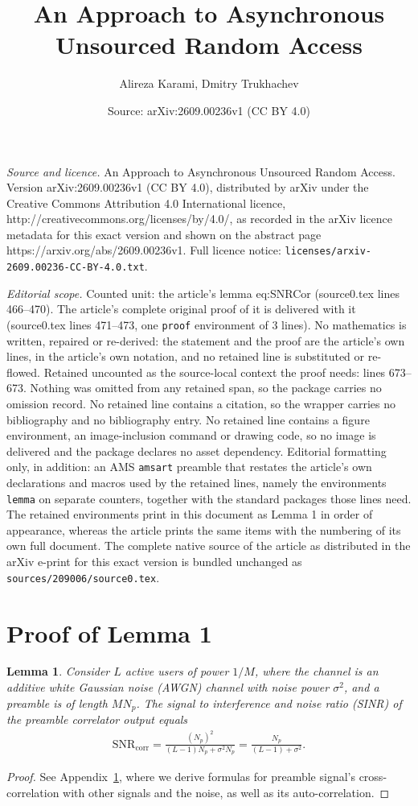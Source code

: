 \documentclass[10pt,a4paper]{amsart}
\title{An Approach to Asynchronous Unsourced Random Access}
\author{Alireza Karami, Dmitry Trukhachev}
\date{Source: arXiv:2609.00236v1 (CC BY 4.0)}
\newtheorem{lemma}{Lemma}
\begin{document}
\maketitle

\noindent\emph{Source and licence.} An Approach to Asynchronous Unsourced Random Access. Version arXiv:2609.00236v1 (CC BY 4.0), distributed by arXiv under the Creative Commons Attribution 4.0 International licence, http://creativecommons.org/licenses/by/4.0/, as recorded in the arXiv licence metadata for this exact version and shown on the abstract page https://arxiv.org/abs/2609.00236v1. Full licence notice: \texttt{licenses/arxiv-2609.00236-CC-BY-4.0.txt}.\par\smallskip

\noindent\textit{Editorial scope.} Counted unit: the article's lemma eq:SNRCor (source0.tex lines 466--470). The article's complete original proof of it is delivered with it (source0.tex lines 471--473, one \texttt{proof} environment of 3 lines). No mathematics is written, repaired or re-derived: the statement and the proof are the article's own lines, in the article's own notation, and no retained line is substituted or re-flowed.  Retained uncounted as the source-local context the proof needs: lines 673--673.  Nothing was omitted from any retained span, so the package carries no omission record.  No retained line contains a citation, so the wrapper carries no bibliography and no bibliography entry.  No retained line contains a figure environment, an image-inclusion command or drawing code, so no image is delivered and the package declares no asset dependency.  Editorial formatting only, in addition: an AMS \texttt{amsart} preamble that restates the article's own declarations and macros used by the retained lines, namely the environments \texttt{lemma} on separate counters, together with the standard packages those lines need.  The retained environments print in this document as Lemma 1 in order of appearance, whereas the article prints the same items with the numbering of its own full document.  The complete native source of the article as distributed in the arXiv e-print for this exact version is bundled unchanged as \texttt{sources/209006/source0.tex}.
\section{Proof of Lemma 1}\label{Ap:Cor}

\begin{lemma} Consider $L$ active users of power $1/M$, where the channel is an additive white Gaussian noise (AWGN) channel with noise power $\sigma^2$, and a preamble is of length $MN_p$. The signal to interference and noise ratio (SINR) of the preamble correlator output equals
	\begin{align}
	\text{SNR}_{\text{corr}} = \frac{(N_p)^2}{(L-1)N_p+\sigma^2N_p}=\frac{N_p}{(L-1)+\sigma^2}.\label{eq:SNRCor}
	\end{align}
\end{lemma}

\begin{proof}
	See Appendix~\ref{Ap:Cor}, where we derive formulas for preamble signal's cross-correlation with other signals and the noise, as well as its auto-correlation.
\end{proof}  
\end{document}
